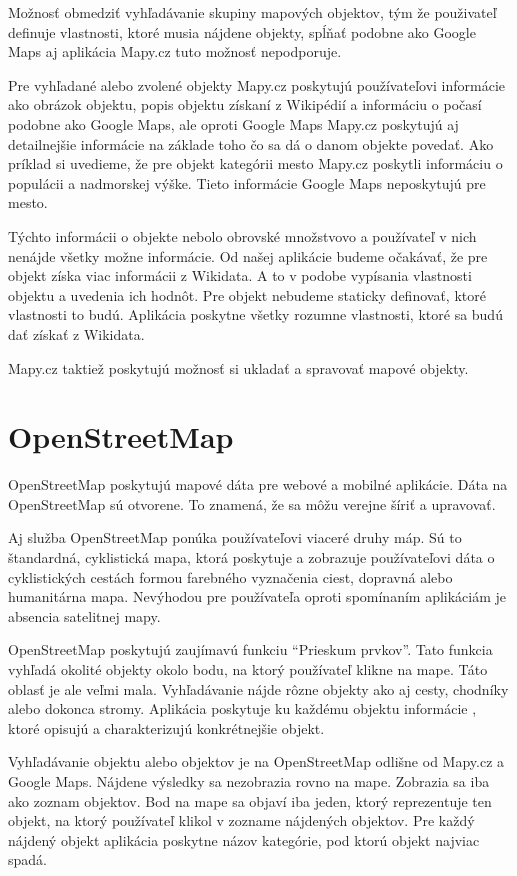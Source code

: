 Možnosť obmedziť vyhľadávanie skupiny mapových objektov, tým že použivateľ definuje vlastnosti,
ktoré musia nájdene objekty, 
spĺňať podobne ako Google Maps aj aplikácia Mapy.cz tuto možnosť nepodporuje. 

Pre vyhľadané alebo zvolené objekty Mapy.cz poskytujú používateľovi informácie ako obrázok objektu, popis objektu získaní z Wikipédií a informáciu o 
počasí podobne ako Google Maps, ale oproti Google Maps Mapy.cz poskytujú aj detailnejšie informácie na základe toho čo sa dá o danom objekte povedať. 
Ako príklad si uvedieme, že pre objekt kategórii mesto Mapy.cz poskytli informáciu o populácii a nadmorskej výške. Tieto informácie Google Maps neposkytujú pre mesto.

Týchto informácii o objekte nebolo obrovské množstvovo a používateľ v nich nenájde všetky možne informácie.
Od našej aplikácie budeme očakávať, že pre objekt získa viac informácii z Wikidata.
A to v podobe vypísania vlastnosti objektu a uvedenia ich hodnôt. Pre objekt nebudeme staticky definovať,
ktoré vlastnosti to budú. Aplikácia poskytne všetky rozumne vlastnosti, ktoré sa budú dať získať z Wikidata. 

Mapy.cz taktiež poskytujú možnosť si ukladať a spravovať mapové objekty. 

\section{OpenStreetMap}
OpenStreetMap poskytujú mapové dáta pre webové a mobilné aplikácie. Dáta na OpenStreetMap sú otvorene. 
To znamená, že sa môžu verejne šíriť a upravovať. 

Aj služba OpenStreetMap ponúka používateľovi viaceré druhy máp.  
Sú to štandardná, cyklistická mapa, ktorá poskytuje a zobrazuje používateľovi dáta o cyklistických 
cestách formou farebného vyznačenia ciest, dopravná alebo humanitárna mapa. 
Nevýhodou pre používateľa oproti spomínaním aplikáciám je absencia satelitnej mapy. 

OpenStreetMap poskytujú zaujímavú funkciu “Prieskum prvkov”. Tato funkcia vyhľadá okolité
objekty okolo bodu, na ktorý používateľ klikne na mape. Táto oblasť je ale veľmi mala.
Vyhľadávanie nájde rôzne objekty ako aj cesty, chodníky alebo dokonca stromy. 
Aplikácia poskytuje ku každému objektu  informácie , ktoré opisujú a charakterizujú konkrétnejšie objekt.

Vyhľadávanie objektu alebo objektov je na OpenStreetMap odlišne od Mapy.cz a Google Maps. 
Nájdene výsledky sa nezobrazia rovno na mape. Zobrazia sa iba ako zoznam objektov. 
Bod na mape sa objaví iba jeden, ktorý reprezentuje ten objekt, na ktorý používateľ 
klikol v zozname nájdených objektov. Pre každý nájdený  objekt aplikácia poskytne názov 
kategórie, pod ktorú objekt najviac spadá. 

